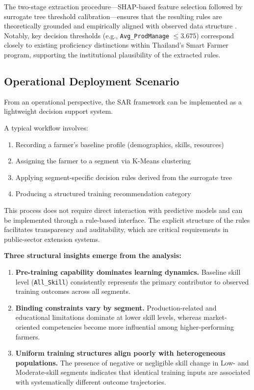 \documentclass[3p,twocolumn,authoryear]{elsarticle}
\begin{document}
The two-stage extraction procedure—SHAP-based feature selection followed
by surrogate tree threshold calibration—ensures that the resulting rules
are theoretically grounded and empirically aligned with observed data
structure \citep{molnar2022}.
Notably, key decision thresholds (e.g.,
\texttt{Avg\_ProdManage} $\leq 3.675$) correspond closely to existing
proficiency distinctions within Thailand’s Smart Farmer program,
supporting the institutional plausibility of the extracted rules.

\subsection{Operational Deployment Scenario}

From an operational perspective, the SAR framework can be implemented as
a lightweight decision support system.

A typical workflow involves:
\begin{enumerate}
  \item Recording a farmer’s baseline profile (demographics, skills, resources)
  \item Assigning the farmer to a segment via K-Means clustering
  \item Applying segment-specific decision rules derived from the surrogate tree
  \item Producing a structured training recommendation category
\end{enumerate}

This process does not require direct interaction with predictive models
and can be implemented through a rule-based interface.
The explicit structure of the rules facilitates transparency and
auditability, which are critical requirements in public-sector extension
systems.

\noindent\textbf{Three structural insights emerge from the analysis:}

\begin{enumerate}
  \item \textbf{Pre-training capability dominates learning dynamics.}
  Baseline skill level (\texttt{All\_Skill}) consistently represents the
  primary contributor to observed training outcomes across all segments.

  \item \textbf{Binding constraints vary by segment.}
  Production-related and educational limitations dominate at lower skill
  levels, whereas market-oriented competencies become more influential
  among higher-performing farmers.

  \item \textbf{Uniform training structures align poorly with heterogeneous populations.}
  The presence of negative or negligible skill change in Low- and
  Moderate-skill segments indicates that identical training inputs are
  associated with systematically different outcome trajectories.
\end{enumerate}
\end{document}
